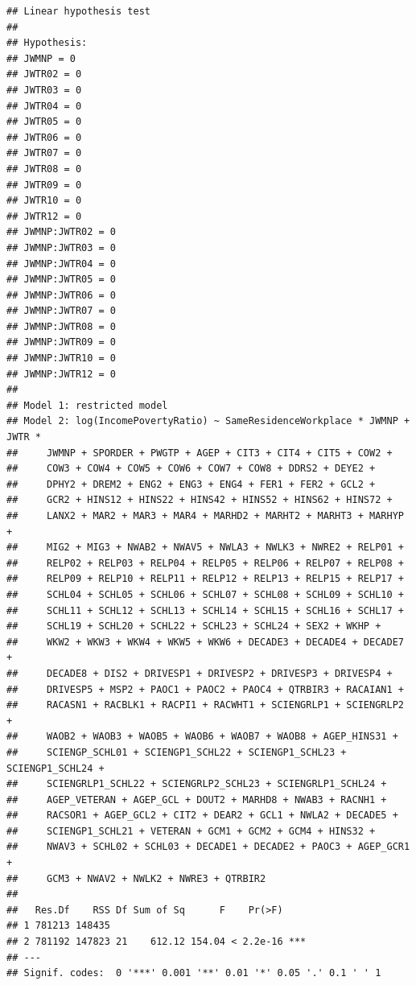\documentclass[
]{article}
\begin{document}
\begin{verbatim}
## Linear hypothesis test
## 
## Hypothesis:
## JWMNP = 0
## JWTR02 = 0
## JWTR03 = 0
## JWTR04 = 0
## JWTR05 = 0
## JWTR06 = 0
## JWTR07 = 0
## JWTR08 = 0
## JWTR09 = 0
## JWTR10 = 0
## JWTR12 = 0
## JWMNP:JWTR02 = 0
## JWMNP:JWTR03 = 0
## JWMNP:JWTR04 = 0
## JWMNP:JWTR05 = 0
## JWMNP:JWTR06 = 0
## JWMNP:JWTR07 = 0
## JWMNP:JWTR08 = 0
## JWMNP:JWTR09 = 0
## JWMNP:JWTR10 = 0
## JWMNP:JWTR12 = 0
## 
## Model 1: restricted model
## Model 2: log(IncomePovertyRatio) ~ SameResidenceWorkplace * JWMNP + JWTR * 
##     JWMNP + SPORDER + PWGTP + AGEP + CIT3 + CIT4 + CIT5 + COW2 + 
##     COW3 + COW4 + COW5 + COW6 + COW7 + COW8 + DDRS2 + DEYE2 + 
##     DPHY2 + DREM2 + ENG2 + ENG3 + ENG4 + FER1 + FER2 + GCL2 + 
##     GCR2 + HINS12 + HINS22 + HINS42 + HINS52 + HINS62 + HINS72 + 
##     LANX2 + MAR2 + MAR3 + MAR4 + MARHD2 + MARHT2 + MARHT3 + MARHYP + 
##     MIG2 + MIG3 + NWAB2 + NWAV5 + NWLA3 + NWLK3 + NWRE2 + RELP01 + 
##     RELP02 + RELP03 + RELP04 + RELP05 + RELP06 + RELP07 + RELP08 + 
##     RELP09 + RELP10 + RELP11 + RELP12 + RELP13 + RELP15 + RELP17 + 
##     SCHL04 + SCHL05 + SCHL06 + SCHL07 + SCHL08 + SCHL09 + SCHL10 + 
##     SCHL11 + SCHL12 + SCHL13 + SCHL14 + SCHL15 + SCHL16 + SCHL17 + 
##     SCHL19 + SCHL20 + SCHL22 + SCHL23 + SCHL24 + SEX2 + WKHP + 
##     WKW2 + WKW3 + WKW4 + WKW5 + WKW6 + DECADE3 + DECADE4 + DECADE7 + 
##     DECADE8 + DIS2 + DRIVESP1 + DRIVESP2 + DRIVESP3 + DRIVESP4 + 
##     DRIVESP5 + MSP2 + PAOC1 + PAOC2 + PAOC4 + QTRBIR3 + RACAIAN1 + 
##     RACASN1 + RACBLK1 + RACPI1 + RACWHT1 + SCIENGRLP1 + SCIENGRLP2 + 
##     WAOB2 + WAOB3 + WAOB5 + WAOB6 + WAOB7 + WAOB8 + AGEP_HINS31 + 
##     SCIENGP_SCHL01 + SCIENGP1_SCHL22 + SCIENGP1_SCHL23 + SCIENGP1_SCHL24 + 
##     SCIENGRLP1_SCHL22 + SCIENGRLP2_SCHL23 + SCIENGRLP1_SCHL24 + 
##     AGEP_VETERAN + AGEP_GCL + DOUT2 + MARHD8 + NWAB3 + RACNH1 + 
##     RACSOR1 + AGEP_GCL2 + CIT2 + DEAR2 + GCL1 + NWLA2 + DECADE5 + 
##     SCIENGP1_SCHL21 + VETERAN + GCM1 + GCM2 + GCM4 + HINS32 + 
##     NWAV3 + SCHL02 + SCHL03 + DECADE1 + DECADE2 + PAOC3 + AGEP_GCR1 + 
##     GCM3 + NWAV2 + NWLK2 + NWRE3 + QTRBIR2
## 
##   Res.Df    RSS Df Sum of Sq      F    Pr(>F)    
## 1 781213 148435                                  
## 2 781192 147823 21    612.12 154.04 < 2.2e-16 ***
## ---
## Signif. codes:  0 '***' 0.001 '**' 0.01 '*' 0.05 '.' 0.1 ' ' 1
\end{verbatim}
\end{document}
